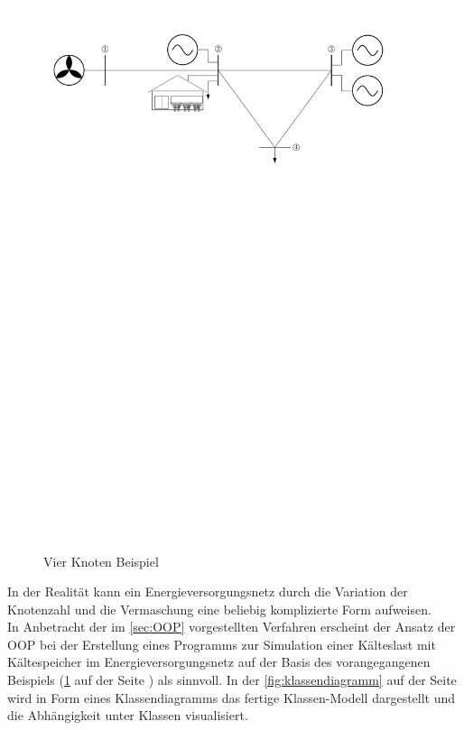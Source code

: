 \begin{figure}[h]
	\begin{center}
	\includegraphics[scale=0.75]{images/SEVN/power_grid}
	\end{center}
\caption{Vier Knoten Beispiel}
\label{fig:vkb}
\end{figure}

\noindent In der Realität kann ein Energieversorgungsnetz durch die Variation
der Knotenzahl und die Vermaschung eine beliebig komplizierte Form aufweisen. \\

In Anbetracht der im \cref{sec:OOP} vorgestellten Verfahren erscheint der Ansatz
der OOP bei der Erstellung eines Programms zur Simulation einer K\"alteslast mit
K\"altespeicher im Energieversorgungsnetz auf der Basis des vorangegangenen
Beispiels (\cref{fig:vkb} auf der Seite \pageref{fig:vkb}) als sinnvoll. In der
\cref{fig:klassendiagramm} auf der Seite \pageref{fig:klassendiagramm} wird in
Form eines Klassendiagramms das fertige Klassen-Modell dargestellt und die
Abh\"angigkeit unter Klassen visualisiert.

